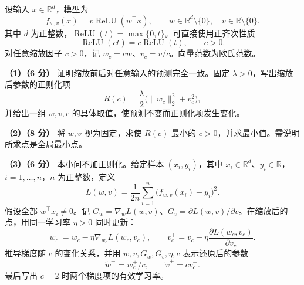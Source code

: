 \documentclass[11pt,a4paper]{article}
\newcommand{\R}{\mathbb R}
\newcommand{\relu}{\operatorname{ReLU}}
\newcommand{\partq}[2]{\par\Needspace{5\baselineskip}\noindent\textbf{（#1）（#2 分）}}
\begin{document}
设输入 $x\in\R^d$，模型为
\[
f_{w,v}(x)=v\relu(w^\top x),\qquad
w\in\R^d\setminus\{0\},\quad v\in\R\setminus\{0\}.
\]
其中 $d$ 为正整数，$\relu(t)=\max\{0,t\}$。可直接使用正齐次性质
\[
\relu(ct)=c\relu(t),\qquad c>0.
\]
对任意缩放因子 $c>0$，记 $w_c=cw$、$v_c=v/c$。向量范数为欧氏范数。

\partq{1}{6} 证明缩放前后对任意输入的预测完全一致。固定 $\lambda>0$，写出缩放后参数的正则化项
\[
R(c)=\frac\lambda2\bigl(\|w_c\|_2^2+v_c^2\bigr),
\]
并给出一组 $w,v,c$ 的具体取值，使预测不变而正则化项发生变化。

\partq{2}{8} 将 $w,v$ 视为固定，求使 $R(c)$ 最小的 $c>0$，并求最小值。需说明所求点是全局最小点。

\partq{3}{6} 本小问不加正则化。给定样本 $(x_i,y_i)$，其中 $x_i\in\R^d$、$y_i\in\R$，$i=1,\ldots,n$，$n$ 为正整数，定义
\[
L(w,v)=\frac1{2n}\sum_{i=1}^n\bigl(f_{w,v}(x_i)-y_i\bigr)^2.
\]
假设全部 $w^\top x_i\ne0$。记 $G_w=\nabla_wL(w,v)$、$G_v=\partial L(w,v)/\partial v$。在缩放后的点，用同一学习率 $\eta>0$ 同时更新：
\[
w_c^+=w_c-\eta\nabla_{w_c}L(w_c,v_c),\qquad
v_c^+=v_c-\eta\frac{\partial L(w_c,v_c)}{\partial v_c}.
\]
推导梯度随 $c$ 的变化关系，并用 $w,v,G_w,G_v,\eta,c$ 表示还原后的参数
\[
\widetilde w^+=w_c^+/c,\qquad \widetilde v^+=c v_c^+.
\]
最后写出 $c=2$ 时两个梯度项的有效学习率。
\end{document}
